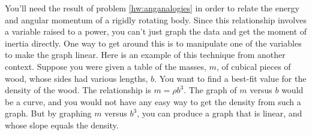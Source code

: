 You'll need the result of problem \ref{hw:anganalogies} in order
to relate the energy and angular momentum of a rigidly rotating body.
Since this relationship involves a variable raised to a power,
you can't just graph the data and get the moment of inertia
directly. One way to get around this is to
manipulate one of the variables to make the graph linear.
Here is an example of this technique from
another context. Suppose you were given a table of the masses, $m$, of cubical
pieces of wood, whose sides had various lengths, $b$. You want
to find a best-fit value for the density of the wood.
The relationship is $m=\rho b^3$. The graph of $m$ versus $b$ would be a curve,
and you would not have any easy way to get the density from such
a graph. But by graphing $m$ versus $b^3$, you can produce a graph that
is linear, and whose slope equals the density.



